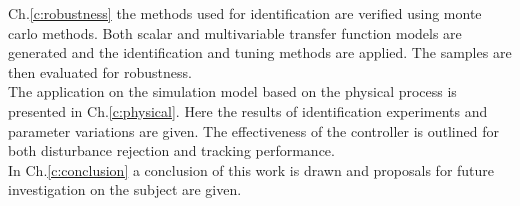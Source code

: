 Ch.\ref{c:robustness} the methods used for identification are verified using monte carlo methods. Both scalar and multivariable transfer function models are generated and the identification and tuning methods are applied. The samples are then evaluated for robustness.\\

The application on the simulation model based on the physical process is presented in Ch.\ref{c:physical}. Here the results of identification experiments and parameter variations are given. The effectiveness of the controller is outlined for both disturbance rejection and tracking performance.\\

In Ch.\ref{c:conclusion} a conclusion of this work is drawn and proposals for future investigation on the subject are given.